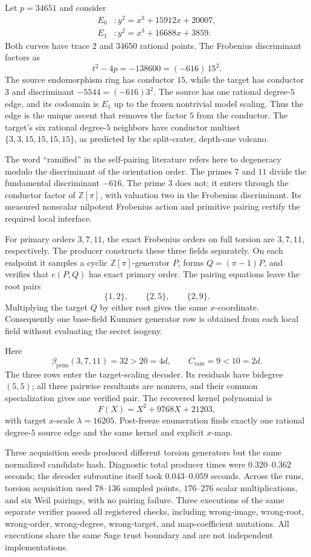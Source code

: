\documentclass[11pt]{article}
\newcommand{\Z}{\mathbb{Z}}
\newcommand{\Cr}{C_{\mathrm{ram}}}
\newcommand{\betaP}{\beta_{\mathrm{prim}}}
\begin{document}
Let $p=34651$ and consider
\[
\begin{split}
 E_0 &: y^2=x^3+15912x+20007,\\
 E_1 &: y^2=x^3+16688x+3859.
\end{split}
\]
Both curves have trace $2$ and $34650$ rational points.  The Frobenius
discriminant factors as
\[
 t^2-4p=-138600=(-616)\,15^2.
\]
The source endomorphism ring has conductor $15$, while the target has
conductor $3$ and discriminant $-5544=(-616)3^2$.  The source has one rational
degree-$5$ edge, and its codomain is $E_1$ up to the frozen nontrivial model
scaling.  Thus the edge is the unique ascent that removes the factor $5$ from
the conductor.  The target's six rational degree-$5$ neighbors have conductor
multiset $\{3,3,15,15,15,15\}$, as predicted by the split-crater, depth-one
volcano.

The word ``ramified'' in the self-pairing literature refers here to
degeneracy modulo the discriminant of the orientation order.  The primes $7$ and
$11$ divide the fundamental discriminant $-616$.  The prime $3$ does not; it
enters through the conductor factor of $\Z[\pi]$, with valuation two in the
Frobenius discriminant.  Its measured nonscalar nilpotent Frobenius action and
primitive pairing certify the required local interface.

For primary orders $3,7,11$, the exact Frobenius orders on full torsion are
$3,7,11$, respectively.  The producer constructs these three fields
separately.  On each endpoint it samples a cyclic $\Z[\pi]$-generator $P$,
forms $Q=(\pi-1)P$, and verifies that $e(P,Q)$ has exact primary order.  The
pairing equations leave the root pairs
\[
 \{1,2\},\qquad\{2,5\},\qquad\{2,9\}.
\]
Multiplying the target $Q$ by either root gives the same $x$-coordinate.
Consequently one base-field Kummer generator row is obtained from each local
field without evaluating the secret isogeny.

Here
\[
 \betaP(3,7,11)=32>20=4d,
 \qquad
 \Cr=9<10=2d.
\]
The three rows enter the target-scaling decoder.  Its residuals have bidegree
$(5,5)$; all three pairwise resultants are nonzero, and their common
specialization gives one verified pair.  The recovered kernel polynomial is
\[
 F(X)=X^2+9768X+21203,
\]
with target $x$-scale $\lambda=16205$.  Post-freeze enumeration finds exactly
one rational degree-$5$ source edge and the same kernel and explicit $x$-map.

Three acquisition seeds produced different torsion generators but the same
normalized candidate hash.  Diagnostic total producer times were
$0.320$--$0.362$ seconds; the decoder subroutine itself took
$0.043$--$0.059$ seconds.
Across the runs, torsion acquisition used $78$--$136$ sampled points,
$176$--$276$ scalar multiplications, and six Weil pairings, with no pairing
failure.  Three executions of the same separate verifier passed all
registered checks, including wrong-image, wrong-root, wrong-order,
wrong-degree, wrong-target, and map-coefficient mutations.  All executions
share the same Sage trust boundary and are not independent implementations.
\end{document}
